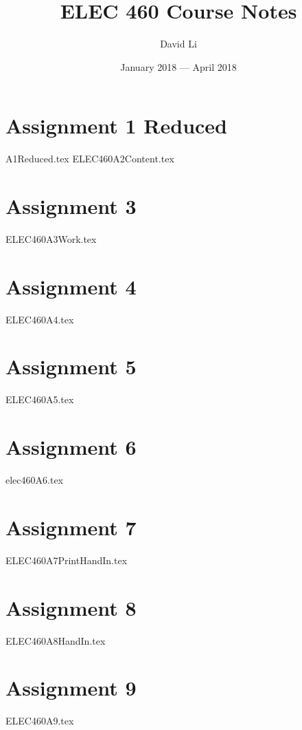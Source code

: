 \documentclass{scrreprt}
\title{ELEC 460 Course Notes}
\author{David Li}
\date{January 2018 --- April 2018}
\theoremstyle{plain}
\theoremstyle{definition}
\theoremstyle{remark}
\begin{document}
\section{Assignment 1 Reduced}
{A1Reduced.tex}
{ELEC460A2Content.tex}

\section{Assignment 3}
{ELEC460A3Work.tex}
\section{Assignment 4}
{ELEC460A4.tex}

\section{Assignment 5}
{ELEC460A5.tex}

\section{Assignment 6}
{elec460A6.tex}

\section{Assignment 7}
{ELEC460A7PrintHandIn.tex}

\section{Assignment 8}
{ELEC460A8HandIn.tex}

\section{Assignment 9}
{ELEC460A9.tex}
\end{document}

